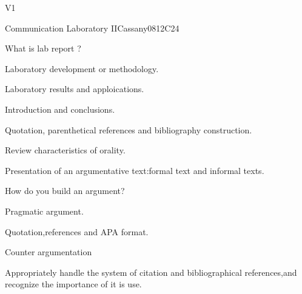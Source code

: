 \begin{syllabus}
\begin{competences}{V1}
    \item {}
\end{competences}

\begin{unit}{Communication Laboratory II}{}{Cassany08}{12}{C24}
   \begin{topics}
      \item What is lab report ?
      \item Laboratory development or methodology.
      \item Laboratory results and apploications.
      \item Introduction and conclusions.
      \item Quotation, parenthetical references and bibliography construction.
      \item Review characteristics of orality.
      \item Presentation of an argumentative text:formal text and informal texts.
      \item How do you build an argument?
      \item Pragmatic argument.
      \item Quotation,references and APA format.
      \item Counter argumentation 
      
   \end{topics}
   \begin{learningoutcomes}
      \item Appropriately handle the system of citation and bibliographical references,and recognize the importance of it is use.
   \end{learningoutcomes}
\end{unit}

\begin{coursebibliography}
\end{coursebibliography}

\end{syllabus}
